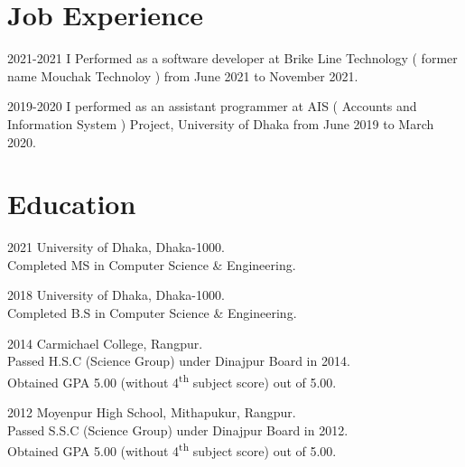\documentclass[a4paper]{article}
\begin{document}
  \section{Job Experience}

  \begin{CV}
  \item[2021-2021] I Performed as a software developer at Brike Line Technology ( former name Mouchak Technoloy ) from June 2021 to November 2021.
  \item[2019-2020] I performed as an assistant programmer at AIS ( Accounts and Information System ) Project, University of Dhaka from June 2019 to March 2020.
  \end{CV}


\section{Education}

\begin{CV}
\item[2021] University of Dhaka, Dhaka-1000.\\Completed MS in Computer Science \& Engineering.
\item[2018] University of Dhaka, Dhaka-1000.\\Completed B.S in Computer Science \& Engineering.
\item[2014] Carmichael College, Rangpur.\\Passed H.S.C (Science Group) under Dinajpur Board in 2014.\\Obtained GPA 5.00 (without 4\textsuperscript{th} subject score) out of 5.00.
\item[2012] Moyenpur High School, Mithapukur, Rangpur.\\Passed S.S.C (Science Group) under Dinajpur Board in 2012.\\Obtained GPA 5.00 (without 4\textsuperscript{th} subject score) out of 5.00.
\end{CV}


\end{document}
